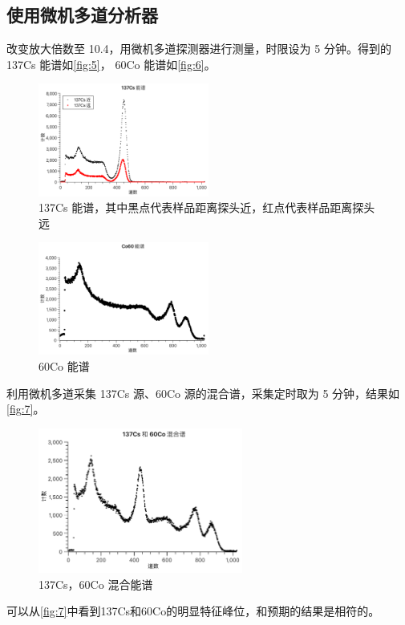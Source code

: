 \documentclass[revtex4-2]{mpltx}
\begin{document}
    \subsection{使用微机多道分析器}
    改变放大倍数至 10.4，用微机多道探测器进行测量，时限设为 5 分钟。得到的 137Cs 能谱如\autoref{fig:5}，
    60Co 能谱如\autoref{fig:6}。
    \begin{figure}[htbp]
        \centering
        \includegraphics[width=0.5\textwidth]{./pic5.pdf}
        \caption{137Cs 能谱，其中黑点代表样品距离探头近，红点代表样品距离探头远}\label{fig:5}
    \end{figure}
    \begin{figure}[htbp]
        \centering
        \includegraphics[width=0.5\textwidth]{./pic6.pdf}
        \caption{60Co 能谱}\label{fig:6}
    \end{figure}
    
    利用微机多道采集 137Cs 源、60Co 源的混合谱，采集定时取为 5 分钟，结果如\autoref{fig:7}。
    \begin{figure}[htbp]
        \centering
        \includegraphics[width=0.6\textwidth]{./pic8.pdf}
        \caption{137Cs，60Co 混合能谱}\label{fig:7}
    \end{figure}
    可以从\autoref{fig:7}中看到137Cs和60Co的明显特征峰位，和预期的结果是相符的。
\end{document}
